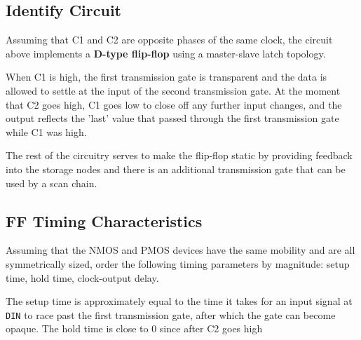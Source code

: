 \documentclass[11pt]{article}
\begin{document}
\subsection{Identify Circuit}

Assuming that C1 and C2 are opposite phases of the same clock, the circuit above implements a \textbf{D-type flip-flop} using a master-slave latch topology.

When C1 is high, the first transmission gate is transparent and the data is allowed to settle at the input of the second transmission gate. At the moment that C2 goes high, C1 goes low to close off any further input changes, and the output reflects the 'last' value that passed through the first transmission gate while C1 was high.

The rest of the circuitry serves to make the flip-flop static by providing feedback into the storage nodes and there is an additional transmission gate that can be used by a scan chain.

\subsection{FF Timing Characteristics}
Assuming that the NMOS and PMOS devices have the same mobility and are all symmetrically sized, order the following timing parameters by magnitude: setup time, hold time, clock-output delay.

The setup time is approximately equal to the time it takes for an input signal at \verb|DIN| to race past the first transmission gate, after which the gate can become opaque. The hold time is close to 0 since after C2 goes high

\newpage
\appendix
\end{document}
